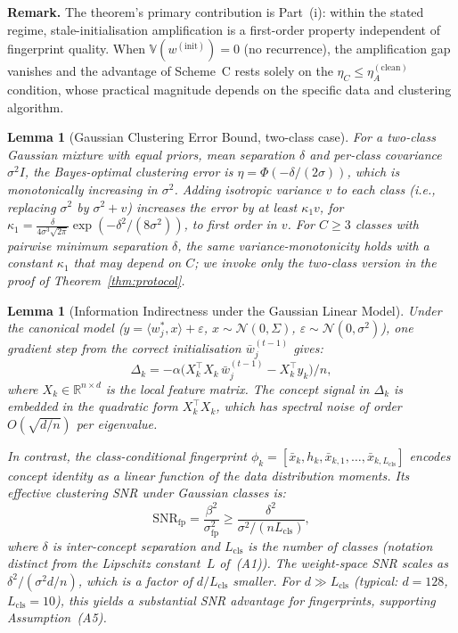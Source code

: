 \documentclass[11pt]{article}
\newcommand{\R}{\mathbb{R}}
\newcommand{\V}{\mathbb{V}}
\newcommand{\wstar}{w^*}
\newcommand{\wbar}{\bar{w}}
\newtheorem{lemma}[theorem]{Lemma}
\begin{document}
\textbf{Remark.} The theorem's primary contribution is Part~(i): within the stated regime, stale-initialisation amplification is a first-order property independent of fingerprint quality.
When $\V(w^{(\mathrm{init})}) = 0$ (no recurrence), the amplification gap vanishes and the advantage of Scheme~C rests solely on the $\eta_C \le \eta_A^{(\mathrm{clean})}$ condition, whose practical magnitude depends on the specific data and clustering algorithm.

\begin{lemma}[Gaussian Clustering Error Bound, two-class case]
\label{lem:gaussian_clustering}
For a two-class Gaussian mixture with equal priors, mean separation $\delta$ and per-class covariance $\sigma^2 I$, the Bayes-optimal clustering error is $\eta = \Phi(-\delta/(2\sigma))$, which is monotonically increasing in $\sigma^2$.
Adding isotropic variance $v$ to each class (i.e., replacing $\sigma^2$ by $\sigma^2 + v$) increases the error by at least $\kappa_1 v$, for $\kappa_1 = \frac{\delta}{4\sigma^3\sqrt{2\pi}} \exp(-\delta^2/(8\sigma^2))$, to first order in $v$.
For $C \ge 3$ classes with pairwise minimum separation $\delta$, the same variance-monotonicity holds with a constant $\kappa_1$ that may depend on $C$; we invoke only the two-class version in the proof of Theorem~\ref{thm:protocol}.
\end{lemma}


\begin{lemma}[Information Indirectness under the Gaussian Linear Model]
\label{lem:info_indirectness}
Under the canonical model ($y = \langle \wstar_j, x \rangle + \varepsilon$, $x \sim \mathcal{N}(0, \Sigma)$, $\varepsilon \sim \mathcal{N}(0, \sigma^2)$), one gradient step from the correct initialisation $\wbar_j^{(t-1)}$ gives:
\[
\Delta_k = -\alpha \bigl(X_k^\top X_k\, \wbar_j^{(t-1)} - X_k^\top y_k\bigr) / n,
\]
where $X_k \in \R^{n \times d}$ is the local feature matrix. The concept signal in $\Delta_k$ is embedded in the quadratic form $X_k^\top X_k$, which has spectral noise of order $O(\sqrt{d/n})$ per eigenvalue.

In contrast, the class-conditional fingerprint $\phi_k = [\bar x_k, h_k, \bar x_{k,1}, \ldots, \bar x_{k,L_{\mathrm{cls}}}]$ encodes concept identity as a \emph{linear} function of the data distribution moments. Its effective clustering SNR under Gaussian classes is:
\begin{equation}
\mathrm{SNR}_{\mathrm{fp}} = \frac{\beta^2}{\sigma_{\mathrm{fp}}^2} \ge \frac{\delta^2}{\sigma^2/(n L_{\mathrm{cls}})},
\end{equation}
where $\delta$ is inter-concept separation and $L_{\mathrm{cls}}$ is the number of classes (notation distinct from the Lipschitz constant~$L$ of~(A1)). The weight-space SNR scales as $\delta^2 / (\sigma^2 d / n)$, which is a factor of $d/L_{\mathrm{cls}}$ smaller. For $d \gg L_{\mathrm{cls}}$ (typical: $d = 128$, $L_{\mathrm{cls}} = 10$), this yields a substantial SNR advantage for fingerprints, supporting Assumption~(A5).
\end{lemma}
\end{document}
